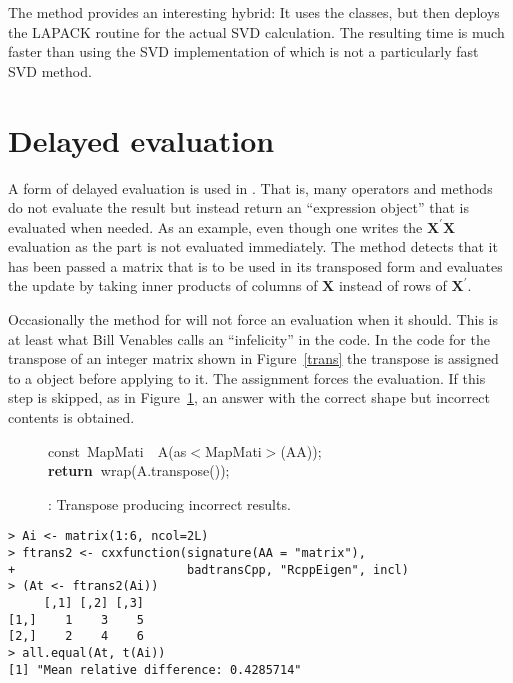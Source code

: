 \documentclass[shortnames,article]{jss}
\newcommand{\hlstd}[1]{\textcolor[rgb]{0,0,0}{#1}}
\newcommand{\hlopt}[1]{\textcolor[rgb]{0,0,0}{#1}}
\newcommand{\hlkwa}[1]{\textcolor[rgb]{0.61,0.13,0.93}{\bf{#1}}}
\newcommand{\hlkwb}[1]{\textcolor[rgb]{0.13,0.54,0.13}{#1}}
\newcommand{\hlkwd}[1]{\textcolor[rgb]{0,0,0}{#1}}
\begin{document}
The  method provides an interesting hybrid: It uses the
 classes, but then deploys the LAPACK routine  for
the actual SVD calculation. The resulting time is much faster than using the
SVD implementation of  which is not a particularly fast SVD
method.


\section{Delayed evaluation}
\label{sec:delayed}

A form of delayed evaluation is used in .  That is, many
operators and methods do not evaluate the result but instead return an
``expression object'' that is evaluated when needed.  As an example,
even though one writes the $\bm X^\prime\bm X$ evaluation as
 the  part is not
evaluated immediately.  The  method detects that it
has been passed a matrix that is to be used in its transposed form and
evaluates the update by taking inner products of columns of $\bm X$
instead of rows of $\bm X^\prime$.

Occasionally the method for  will not force an
evaluation when it should.  This is at least what Bill Venables calls
an ``infelicity'' in the code. %
In the code for the transpose of an integer matrix shown in
Figure~\ref{trans} the transpose is assigned to a  object
before applying  to it.  The assignment forces the evaluation.  If
this step is skipped, as in Figure~\ref{badtrans}, an answer with the correct
shape but incorrect contents is obtained.

\begin{figure}[htb]
  \noindent
  \ttfamily
  \hlstd{}\hlkwb{const\ }\hlstd{MapMati}\hlstd{\ \ }\hlstd{}\hlkwd{A}\hlstd{}\hlopt{(}\hlstd{as}\hlopt{$<$}\hlstd{MapMati}\hlopt{$>$(}\hlstd{AA}\hlopt{));}\hspace*{\fill}\\
  \hlstd{}\hlkwa{return\ }\hlstd{}\hlkwd{wrap}\hlstd{}\hlopt{(}\hlstd{A}\hlopt{.}\hlstd{}\hlkwd{transpose}\hlstd{}\hlopt{());}\hlstd{}\hspace*{\fill}\\
  \mbox{}
  \normalfont
  \normalsize
  \caption{: Transpose producing incorrect results.}
  \label{badtrans}
\end{figure}
\begin{verbatim}
> Ai <- matrix(1:6, ncol=2L)
> ftrans2 <- cxxfunction(signature(AA = "matrix"), 
+                        badtransCpp, "RcppEigen", incl)
> (At <- ftrans2(Ai))
     [,1] [,2] [,3]
[1,]    1    3    5
[2,]    2    4    6
> all.equal(At, t(Ai))
[1] "Mean relative difference: 0.4285714"
\end{verbatim}
\end{document}
